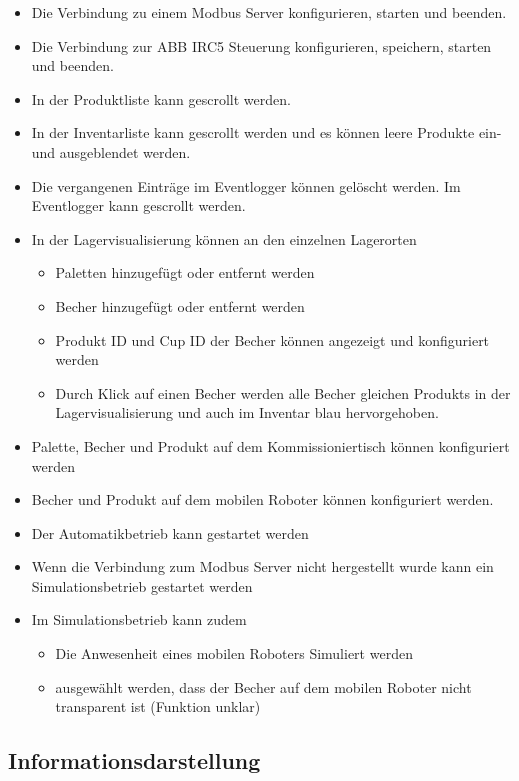 \begin{itemize}
    \item Die Verbindung zu einem Modbus Server konfigurieren, starten und beenden.
    \item Die Verbindung zur ABB IRC5 Steuerung konfigurieren, speichern, starten und beenden.
    \item In der Produktliste kann gescrollt werden.
    \item In der Inventarliste kann gescrollt werden und es können leere Produkte ein- und ausgeblendet werden.
    \item Die vergangenen Einträge im Eventlogger können gelöscht werden. Im Eventlogger kann gescrollt werden.
    \item In der Lagervisualisierung können an den einzelnen Lagerorten
    \begin{itemize}
        \item Paletten hinzugefügt oder entfernt werden
        \item Becher hinzugefügt oder entfernt werden
        \item Produkt ID und Cup ID der Becher können angezeigt und konfiguriert werden
        \item Durch Klick auf einen Becher werden alle Becher gleichen Produkts in der Lagervisualisierung und auch im
        Inventar blau hervorgehoben.
    \end{itemize}
    \item Palette, Becher und Produkt auf dem Kommissioniertisch können konfiguriert werden
    \item Becher und Produkt auf dem mobilen Roboter können konfiguriert werden.
    \item Der Automatikbetrieb kann gestartet werden
    \item Wenn die Verbindung zum Modbus Server nicht hergestellt wurde kann ein Simulationsbetrieb gestartet werden
    \item Im Simulationsbetrieb kann zudem
    \begin{itemize}
        \item Die Anwesenheit eines mobilen Roboters Simuliert werden
        \item ausgewählt werden, dass der Becher auf dem mobilen Roboter nicht transparent ist (Funktion unklar)
    \end{itemize}
\end{itemize}

\subsection{Informationsdarstellung}

